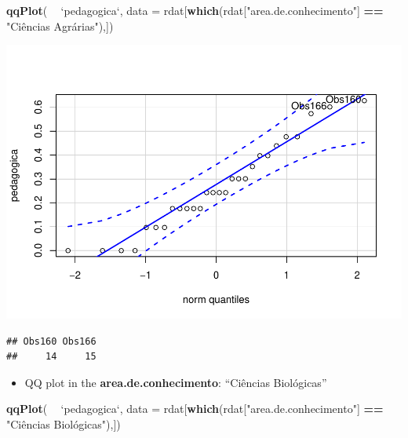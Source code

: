 \documentclass[]{article}
\newenvironment{Shaded}{\begin{snugshade}}{\end{snugshade}}
\newcommand{\DataTypeTok}[1]{\textcolor[rgb]{0.13,0.29,0.53}{#1}}
\newcommand{\KeywordTok}[1]{\textcolor[rgb]{0.13,0.29,0.53}{\textbf{#1}}}
\newcommand{\NormalTok}[1]{#1}
\newcommand{\OperatorTok}[1]{\textcolor[rgb]{0.81,0.36,0.00}{\textbf{#1}}}
\newcommand{\StringTok}[1]{\textcolor[rgb]{0.31,0.60,0.02}{#1}}
\providecommand{\tightlist}{%
  \setlength{\itemsep}{0pt}\setlength{\parskip}{0pt}}
\begin{document}
\begin{Shaded}
\begin{Highlighting}[]
\KeywordTok{qqPlot}\NormalTok{( }\OperatorTok{~}\StringTok{ `}\DataTypeTok{pedagogica}\StringTok{`}\NormalTok{, }\DataTypeTok{data =}\NormalTok{ rdat[}\KeywordTok{which}\NormalTok{(rdat[}\StringTok{"area.de.conhecimento"}\NormalTok{] }\OperatorTok{==}\StringTok{ "Ciências Agrárias"}\NormalTok{),])}
\end{Highlighting}
\end{Shaded}

\includegraphics{factorialAnova_files/figure-latex/unnamed-chunk-12-1.pdf}

\begin{verbatim}
## Obs160 Obs166 
##     14     15
\end{verbatim}

\begin{itemize}
\tightlist
\item
  QQ plot in the \textbf{area.de.conhecimento}: ``Ciências Biológicas''
\end{itemize}

\begin{Shaded}
\begin{Highlighting}[]
\KeywordTok{qqPlot}\NormalTok{( }\OperatorTok{~}\StringTok{ `}\DataTypeTok{pedagogica}\StringTok{`}\NormalTok{, }\DataTypeTok{data =}\NormalTok{ rdat[}\KeywordTok{which}\NormalTok{(rdat[}\StringTok{"area.de.conhecimento"}\NormalTok{] }\OperatorTok{==}\StringTok{ "Ciências Biológicas"),])}
\end{Highlighting}
\end{Shaded}
\end{document}
